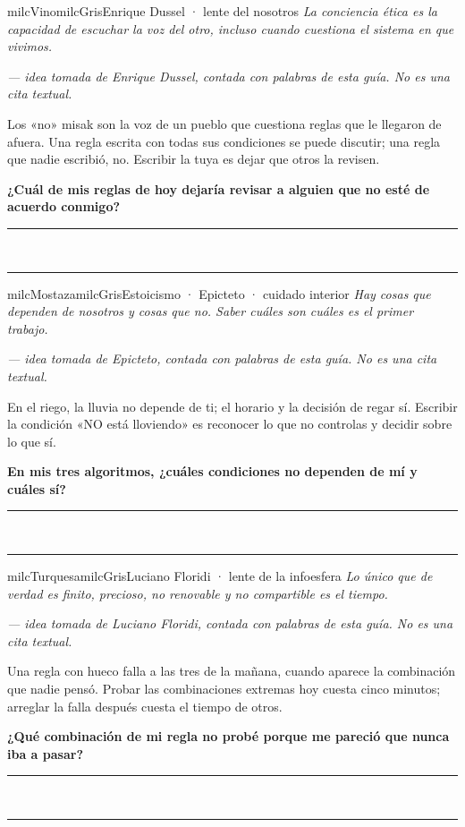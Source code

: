 \documentclass[11pt,letterpaper]{article}
\newcommand{\linead}[1]{\noindent\color{milcLinea}\rule{#1}{0.5pt}\color{milcNegro}}
\begin{document}
\begin{softbox}{milcVino}{milcGris}{Enrique Dussel · lente del nosotros}
\textit{La conciencia ética es la capacidad de escuchar la voz del otro, incluso cuando cuestiona el sistema en que vivimos.}

{\footnotesize\itshape\color{milcNegro!70}--- idea tomada de Enrique Dussel, contada con palabras de esta guía. No es una cita textual.}

Los «no» misak son la voz de un pueblo que cuestiona reglas que le llegaron de afuera. Una regla escrita con todas sus condiciones se puede discutir; una regla que nadie escribió, no. Escribir la tuya es dejar que otros la revisen.

\textbf{¿Cuál de mis reglas de hoy dejaría revisar a alguien que no esté de acuerdo conmigo?}
\end{softbox}
\linead{\linewidth}\\[1mm]
\linead{\linewidth}

\begin{softbox}{milcMostaza}{milcGris}{Estoicismo · Epicteto · cuidado interior}
\textit{Hay cosas que dependen de nosotros y cosas que no. Saber cuáles son cuáles es el primer trabajo.}

{\footnotesize\itshape\color{milcNegro!70}--- idea tomada de Epicteto, contada con palabras de esta guía. No es una cita textual.}

En el riego, la lluvia no depende de ti; el horario y la decisión de regar sí. Escribir la condición «NO está lloviendo» es reconocer lo que no controlas y decidir sobre lo que sí.

\textbf{En mis tres algoritmos, ¿cuáles condiciones no dependen de mí y cuáles sí?}
\end{softbox}
\linead{\linewidth}\\[1mm]
\linead{\linewidth}

\begin{softbox}{milcTurquesa}{milcGris}{Luciano Floridi · lente de la infoesfera}
\textit{Lo único que de verdad es finito, precioso, no renovable y no compartible es el tiempo.}

{\footnotesize\itshape\color{milcNegro!70}--- idea tomada de Luciano Floridi, contada con palabras de esta guía. No es una cita textual.}

Una regla con hueco falla a las tres de la mañana, cuando aparece la combinación que nadie pensó. Probar las combinaciones extremas hoy cuesta cinco minutos; arreglar la falla después cuesta el tiempo de otros.

\textbf{¿Qué combinación de mi regla no probé porque me pareció que nunca iba a pasar?}
\end{softbox}
\linead{\linewidth}\\[1mm]
\linead{\linewidth}
\end{document}
